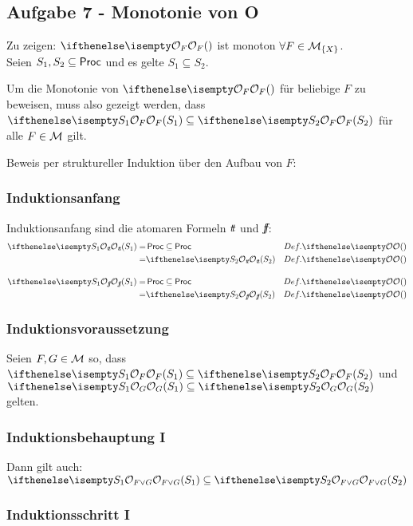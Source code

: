 \subsection*{Aufgabe 7 - Monotonie von O}


Zu zeigen: $\OSem{F}{}$ ist monoton $\forall F \in \mathcal{M}_{\{X\}}$. \\
Seien $S_1, S_2 \subseteq \operatorname{\sf Proc}$ und es gelte $S_1 \subseteq S_2$.

Um die Monotonie von $\OSem{F}{}$ für beliebige $F$ zu beweisen, muss also gezeigt werden, dass
 $ \OSem{F}{S_1} \subseteq \OSem{F}{S_2}$ für alle $F \in \mathcal{M}$ gilt.

Beweis per struktureller Induktion über den Aufbau von $F$:

\subsubsection*{Induktionsanfang}
Induktionsanfang sind die atomaren Formeln $\mathop{\textit{t}\!\textit{t}}$ und $\mathop{\textit{f}\!\textit{f}}$: \\

\begin{align*}
\OSem{\true}{S_1} =& \Proc \subseteq \Proc  & Def. \OSem{}{}\\
=& \OSem{\true}{S_2} & Def. \OSem{}{}
\end{align*}

\begin{align*}
\OSem{\false}{S_1} =& \Proc \subseteq \Proc & Def. \OSem{}{} \\
=& \OSem{\false}{S_2} & Def. \OSem{}{}
\end{align*}

\subsubsection*{Induktionsvoraussetzung}

Seien $F, G \in \mathcal{M}$ so, dass $\OSem{F}{S_1} \subseteq \OSem{F}{S_2}$ und
$\OSem{G}{S_1} \subseteq \OSem{G}{S_2}$ gelten.



\subsubsection*{Induktionsbehauptung I}

Dann gilt auch:
$\OSem{F \lor G}{S_1} \subseteq \OSem{F \lor G}{S_2} $ \\

\subsubsection*{Induktionsschritt I}



